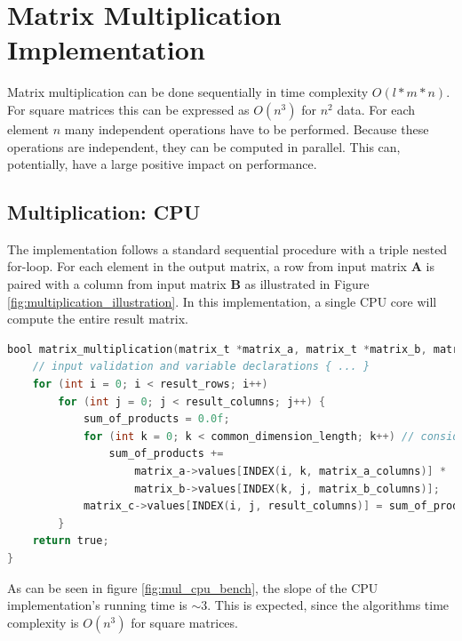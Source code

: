 \section{Matrix Multiplication Implementation}

Matrix multiplication can be done sequentially in time complexity $O(l * m * n)$. For square matrices this can be expressed as $O(n^3)$ for $n^2$ data. For each element $n$ many independent operations have to be performed. Because these operations are independent, they can be computed in parallel. This can, potentially, have a large positive impact on performance.

\subsection{Multiplication: CPU}


The implementation follows a standard sequential procedure with a triple nested for-loop. For each element in the output matrix, a row from input matrix $\mathbf{A}$ is paired with a column from input matrix $\mathbf{B}$ as illustrated in Figure \ref{fig:multiplication_illustration}.  In this implementation, a single CPU core will compute the entire result matrix.

\begin{lstlisting}[language=C, caption={Matrix Multiplication on the CPU}, label={lst:matrix_multiplication_cpu}]
bool matrix_multiplication(matrix_t *matrix_a, matrix_t *matrix_b, matrix_t *matrix_c) {
    // input validation and variable declarations { ... }
    for (int i = 0; i < result_rows; i++)
        for (int j = 0; j < result_columns; j++) {
            sum_of_products = 0.0f;
            for (int k = 0; k < common_dimension_length; k++) // consider renaming to m
                sum_of_products +=
                    matrix_a->values[INDEX(i, k, matrix_a_columns)] *
                    matrix_b->values[INDEX(k, j, matrix_b_columns)];
            matrix_c->values[INDEX(i, j, result_columns)] = sum_of_products;
        }
    return true;
}
\end{lstlisting}

As can be seen in figure \ref{fig:mul_cpu_bench}, the slope of the CPU implementation's running time is $\sim 3$. This is expected, since the algorithms time complexity is $O(n^3)$ for square matrices.

